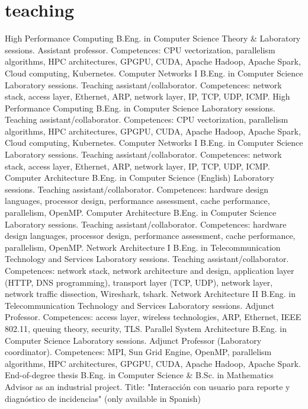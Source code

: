\documentclass[]{friggeri-cv}
\begin{document}
\section{teaching}
\begin{entrylist}
{High Performance Computing}
{B.Eng. in Computer Science}
{Theory \& Laboratory sessions. Assistant professor. Competences: CPU vectorization, parallelism algorithms, HPC architectures, GPGPU, CUDA, Apache Hadoop, Apache Spark, Cloud computing, Kubernetes. 
}
{Computer Networks I}
{B.Eng. in Computer Science}
{Laboratory sessions. Teaching assistant/collaborator. Competences: network stack, access layer, Ethernet, ARP, network layer, IP, TCP, UDP, ICMP. 
}
{High Performance Computing}
{B.Eng. in Computer Science}
{Laboratory sessions. Teaching assistant/collaborator. Competences: CPU vectorization, parallelism algorithms, HPC architectures, GPGPU, CUDA, Apache Hadoop, Apache Spark, Cloud computing, Kubernetes. 
}
{Computer Networks I}
{B.Eng. in Computer Science}
{Laboratory sessions. Teaching assistant/collaborator. Competences: network stack, access layer, Ethernet, ARP, network layer, IP, TCP, UDP, ICMP. %
}
{Computer Architecture}
{B.Eng. in Computer Science (English)}
{Laboratory sessions. Teaching assistant/collaborator. Competences: hardware design languages, processor design, performance assessment, cache performance, parallelism, OpenMP. %
}
{Computer Architecture}
{B.Eng. in Computer Science}
{Laboratory sessions. Teaching assistant/collaborator. Competences: hardware design languages, processor design, performance assessment, cache performance, parallelism, OpenMP. %
}
{Network Architecture I}
{B.Eng. in Telecommunication Technology and Services}
{Laboratory sessions. Teaching assistant/collaborator. Competences: network stack, network architecture and design, application layer (HTTP, DNS programming), transport layer (TCP, UDP), network layer, network traffic dissection, Wireshark, tshark. %
}
{Network Architecture II}
{B.Eng. in Telecommunication Technology and Services}
{Laboratory sessions. Adjunct Professor. Competences: access layer, wireless technologies, ARP, Ethernet, IEEE 802.11, queuing theory, security, TLS. %
}
{Parallel System Architecture}
{B.Eng. in Computer Science}
{Laboratory sessions. Adjunct Professor (Laboratory coordinator). Competences: MPI, Sun Grid Engine, OpenMP, parallelism algorithms, HPC architectures, GPGPU, CUDA, Apache Hadoop, Apache Spark. %
}
{End-of-degree thesis}
{B.Eng. in Computer Science \& B.Sc. in Mathematics}
{Advisor as an industrial project. Title: "Interacción con usuario para reporte y diagnóstico de incidencias" (only available in Spanish)
}
\end{entrylist}
\end{document}
